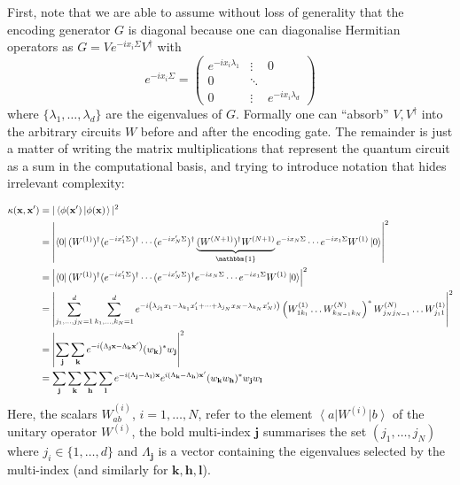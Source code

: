 \documentclass[aps, reprint, onecolumn, nofootinbib, longbibliography]{revtex4-2}
\newcommand{\ket}[1]{\ensuremath{\left| #1 \right \rangle}}
\newcommand{\bra}[1]{\ensuremath{\left \langle #1 \right |}}
\newcommand{\braket}[2]{\ensuremath{\left\langle #1\left|#2 \right.\right\rangle}}
\begin{document}
First, note that we are able to assume without loss of generality that the encoding generator $G$ is diagonal because one can diagonalise Hermitian operators as $G = V e^{-i x_i \Sigma} V^{\dagger}$ with \begin{equation}
    e^{-i x_i \Sigma} = 
    \begin{pmatrix}
    e^{-i x_i \lambda_1} & \vdots & 0 \\
    0 & \ddots &  \\
    0 & \vdots &  e^{-i x_i \lambda_d}
    \end{pmatrix}
\end{equation}
where $\{\lambda_1, \dots, \lambda_d\}$ are the eigenvalues of $G$. Formally one can ``absorb'' $V, V^{\dagger}$ into the arbitrary circuits $W$ before and after the encoding gate. The remainder is just a matter of writing the matrix multiplications that represent the quantum circuit as a sum in the computational basis, and trying to introduce notation that hides irrelevant complexity:

\begin{align} \label{eq:eff_kernel_fourier}
    \kappa (\mathbf{x}, \mathbf{x}') &=  |\braket{\phi(\mathbf{x}')}{\phi(\mathbf{x})} |^2 \\
    &= \left| \bra{0} (W^{(1)})^{\dagger} (e^{-i x'_1 \Sigma} )^{\dagger} \cdots (e^{-i x'_N \Sigma} )^{\dagger} \underbrace{(W^{(N+1)})^{\dagger}  W^{(N+1)}}_{\mathbbm{1}} e^{-i x_N \Sigma}  \cdots e^{-i x_1 \Sigma}  W^{(1)}\ket{0}\right|^2\\
    &= \left|\bra{0} (W^{(1)})^{\dagger} (e^{-i x'_1 \Sigma} )^{\dagger} \cdots (e^{-i x'_N \Sigma} )^{\dagger}  e^{-i x_N \Sigma}  \cdots e^{-i x_1 \Sigma}  W^{(1)}\ket{0}\right|^2\\
    &= \left|\sum_{j_1, \dots, j_N = 1}^{d} \sum_{k_1, \dots, k_N = 1}^{d}  e^{-i \left( \lambda_{j_1}x_1 - \lambda_{k_1}x'_1 + \dots + \lambda_{j_N}x_N - \lambda_{k_N}x'_N) \right)} \left( W^{(1)}_{1 k_1} \dots W^{(N)}_{k_{N-1} k_N} \right)^* W^{(N)}_{j_N j_{N-1}}   \dots W^{(1)}_{j_1 1} \right|^2\\
     &= \left|\sum_{\mathbf{j}} \sum_{\mathbf{k}} e^{-i \left( \Lambda_{\mathbf{j}}\mathbf{x} - \Lambda_{\mathbf{k}}\mathbf{x}' \right) } (w_{\mathbf{k}})^* w_{\mathbf{j}} \right|^2\\
     &= \sum_{\mathbf{j}} \sum_{\mathbf{k}}\sum_{\mathbf{h}} \sum_{\mathbf{l}}  e^{-i \left( \Lambda_{\mathbf{j}} - \Lambda_{\mathbf{l}} \right) \mathbf{x} } e^{i \left( \Lambda_{\mathbf{k}} - \Lambda_{\mathbf{h}} \right) \mathbf{x}' } (w_{\mathbf{k}}w_{\mathbf{h}})^* w_{\mathbf{j}}w_{\mathbf{l}} 
\end{align}
Here, the scalars $W^{(i)}_{a b}$, $i=1, \dots, N$, refer to the element $\bra{a} W^{(i)}\ket{b}$ of the unitary operator $W^{(i)}$, the bold multi-index $\mathbf{j}$ summarises the set $(j_1, \dots, j_N)$ where $j_i \in \{1, \dots, d\}$ and $\Lambda_{\mathbf{j}}$ is a vector containing the eigenvalues selected by the multi-index (and similarly for $\mathbf{k}, \mathbf{h}, \mathbf{l}$).\\
\end{document}
